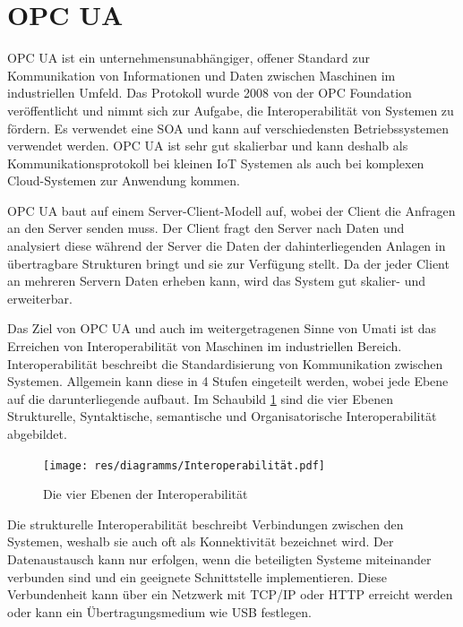 \documentclass[a4paper, 12pt, oneside]{scrbook}
\begin{document}
	
	
	\section{OPC UA}
	
	\ac{OPC UA} ist ein unternehmensunabhängiger, offener Standard zur Kommunikation von Informationen und Daten zwischen Maschinen im industriellen Umfeld. Das Protokoll wurde 2008 von der OPC Foundation veröffentlicht und nimmt sich zur Aufgabe, die Interoperabilität von Systemen zu fördern. Es verwendet eine \ac{SOA} und kann auf verschiedensten Betriebssystemen verwendet werden. OPC UA ist sehr gut skalierbar und kann deshalb als Kommunikationsprotokoll bei kleinen \ac{IoT} Systemen als auch bei komplexen Cloud-Systemen zur Anwendung kommen. 
	 
	OPC UA baut auf einem Server-Client-Modell auf, wobei der Client die Anfragen an den Server senden muss. Der Client fragt den Server nach Daten und analysiert diese während der Server die Daten der dahinterliegenden Anlagen in übertragbare Strukturen bringt und sie zur Verfügung stellt. Da der jeder Client an mehreren Servern Daten erheben kann, wird das System gut skalier- und erweiterbar.
	
	Das Ziel von OPC UA und auch im weitergetragenen Sinne von Umati ist das Erreichen von Interoperabilität von Maschinen im industriellen Bereich. Interoperabilität beschreibt die Standardisierung von Kommunikation zwischen Systemen. Allgemein kann diese in 4 Stufen eingeteilt werden, wobei jede Ebene auf die darunterliegende aufbaut. Im Schaubild \ref{fig:Interoperabilität} sind die vier Ebenen Strukturelle, Syntaktische, semantische und Organisatorische Interoperabilität abgebildet.
	 
	 \begin{figure}[H]
	 	\centering
	 	\texttt{[image: res/diagramms/Interoperabilität.pdf]}
	 	\caption{Die vier Ebenen der Interoperabilität}
	 	\label{fig:Interoperabilität}
	 \end{figure}
	 
	 Die strukturelle Interoperabilität beschreibt Verbindungen zwischen den Systemen, weshalb sie auch oft als Konnektivität bezeichnet wird. Der Datenaustausch kann nur erfolgen, wenn die beteiligten Systeme miteinander verbunden sind und ein geeignete Schnittstelle implementieren. Diese Verbundenheit kann über ein Netzwerk mit TCP/IP oder HTTP erreicht werden oder kann ein Übertragungsmedium wie USB festlegen. \cite{mielebacher_verteilte_2021}
	 
\end{document}
